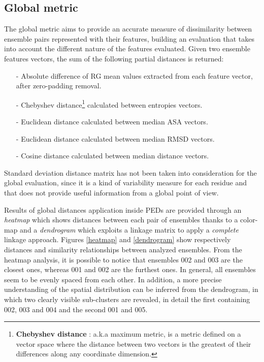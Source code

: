 \subsection{Global metric}
The global metric aims to provide an accurate measure of dissimilarity between ensemble pairs represented with their features, building an evaluation that takes into account the different nature of the features evaluated. Given two ensemble features vectors, the sum of the following partial distances is returned:
\begin{itemize}
\item[-] Absolute difference of RG mean values extracted from each feature vector, after zero-padding removal.
\item[-] Chebyshev distance\footnote{\textbf{Chebyshev distance} : a.k.a maximum metric, is a metric defined on a vector space where the distance between two vectors is the greatest of their differences along any coordinate dimension.} calculated between entropies vectors.
\item[-] Euclidean distance calculated between median ASA vectors.
\item[-] Euclidean distance calculated between median RMSD vectors.
\item[-] Cosine distance calculated between median distance vectors.
\end{itemize}

Standard deviation distance matrix has not been taken into consideration for the global evaluation, since it is a kind of variability measure for each residue and that does not provide useful information from a global point of view.

Results of global distances application inside PEDs are provided through an \emph{heatmap} which shows distances between each pair of ensembles thanks to a color-map and a \emph{dendrogram} which exploits a linkage matrix to apply a \emph{complete} linkage approach.
Figures \ref{heatmap} and \ref{dendrogram} show respectively distances and similarity relationships between analyzed ensembles. From the heatmap analysis, it is possible to notice that ensembles 002 and 003 are the closest ones, whereas 001 and 002 are the furthest ones. In general, all ensembles seem to be evenly spaced from each other. In addition, a more precise understanding of the spatial distribution can be inferred from the dendrogram, in which two clearly visible sub-clusters are revealed, in detail the first containing 002, 003 and 004 and the second 001 and 005.

